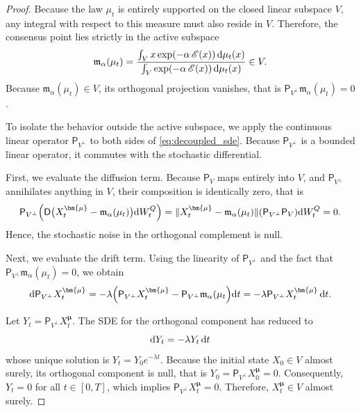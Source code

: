 \documentclass[12pt]{amsart}
\newcommand{\D}[1]{\mbox{\rm #1}}
\newcommand{\dd}{\D{d}}
\numberwithin{equation}{section}
\begin{document}
\begin{proof}
Because the law $\mu_t$ is entirely supported on the closed linear subspace $V$, any integral with respect to this measure must also reside in $V$. Therefore, the consensus point lies strictly in the active subspace
\begin{equation*}
    \mathfrak{m}_\alpha(\mu_t) = \frac{\int_V x \exp(-\alpha\, \mathscr{E}(x)) \,\dd\mu_t(x)}{\int_V \exp(-\alpha \, \mathscr{E}(x))\, \dd\mu_t(x)} \in V.
\end{equation*}
Because $\mathfrak{m}_\alpha(\mu_t) \in V$, its orthogonal projection vanishes, that is $\mathsf{P}_{V^\perp} \mathfrak{m}_\alpha(\mu_t) = 0$.

To isolate the behavior outside the active subspace, we apply the continuous linear operator $\mathsf{P}_{V^\perp}$ to both sides of \eqref{eq:decoupled_sde}. Because $\mathsf{P}_{V^\perp}$ is a bounded linear operator, it commutes with the stochastic differential. 

First, we evaluate the diffusion term. Because $\mathsf{P}_V$ maps entirely into $V$, and $\mathsf{P}_{V^\perp}$ annihilates anything in $V$, their composition is identically zero, that is
\begin{equation*}
    \mathsf{P}_{V^\perp} \Big( \mathsf{D}\big(X^{\bm{\mu}}_t - \mathfrak{m}_\alpha(\mu_t)\big) \dd W_t^Q \Big) =\|X^{\bm{\mu}}_t - \mathfrak{m}_\alpha(\mu_t)\| (\mathsf{P}_{V^\perp} \mathsf{P}_V) \dd W_t^Q = 0.
\end{equation*}
Hence, the stochastic noise in the orthogonal complement is null. 

Next, we evaluate the drift term. Using the linearity of $\mathsf{P}_{V^\perp}$ and the fact that $\mathsf{P}_{V^\perp} \mathfrak{m}_\alpha(\mu_t) = 0$, we obtain
\begin{equation*}
    \dd \mathsf{P}_{V^\perp}X^{\bm{\mu}}_t = -\lambda \Big(\mathsf{P}_{V^\perp} X^{\bm{\mu}}_t - \mathsf{P}_{V^\perp} \mathfrak{m}_\alpha(\mu_t\Big)\dd t = -\lambda \mathsf{P}_{V^\perp} X^{\bm{\mu}}_t \,\dd t.
\end{equation*}

Let $Y_t = \mathsf{P}_{V^\perp} X^{\bm{\mu}}_t$. The SDE for the orthogonal component has reduced to
\begin{equation*}
    \dd Y_t = -\lambda Y_t \,\dd t
\end{equation*}
whose unique solution is $Y_t = Y_0 e^{-\lambda t}$. 
Because the initial state $X_0 \in V$ almost surely, its orthogonal component is null, that is $Y_0 = \mathsf{P}_{V^\perp} X^{\bm{\mu}}_0 = 0$. Consequently, $Y_t = 0$ for all $t \in[0,T]$, which implies $\mathsf{P}_{V^\perp}X^{\bm{\mu}}_t = 0$. Therefore, $X^{\bm{\mu}}_t\in V$ almost surely.
\end{proof}
\end{document}
